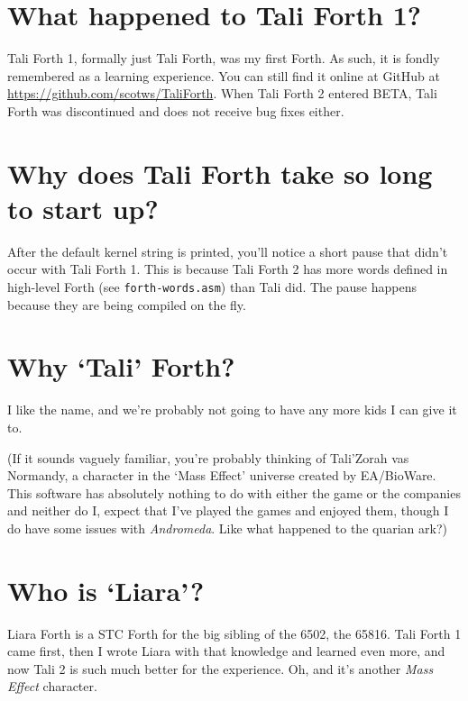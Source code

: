 \section{What happened to Tali Forth 1?} 

Tali Forth 1, formally just Tali Forth, was my first Forth.
As such, it is fondly remembered as a learning experience. You can still find it
online at GitHub at
\href{https://github.com/scotws/TaliForth}{https://github.com/scotws/TaliForth}.
When Tali Forth 2 entered BETA, Tali Forth was discontinued and does not receive
bug fixes either.

\section{Why does Tali Forth take so long to start up?}

After the default kernel string is printed, you'll notice a short pause that
didn't occur with Tali Forth 1. This is because Tali Forth 2 has more words
defined in high-level Forth (see \texttt{forth-words.asm}) than Tali did. The
pause happens because they are being compiled on the fly.

\section{Why `Tali' Forth?}

I like the name, and we're probably not going to have any more kids I can give
it to.

(If it sounds vaguely familiar, you're probably thinking of Tali'Zorah vas
Normandy, a character in the `Mass
Effect' universe created by EA/BioWare.  This
software has absolutely nothing to do with either the game or the companies and
neither do I, expect that I've played the games and enjoyed them, though I do
have some issues with \emph{Andromeda}. Like what happened to the quarian ark?)

\section{Who is `Liara'?}

Liara Forth is a STC Forth for the big sibling of the 6502, the
65816. Tali Forth 1 came first, then I wrote
Liara with that knowledge and learned even more, and now Tali 2 is such much
better for the experience. Oh, and it's another \textit{Mass Effect} character.

